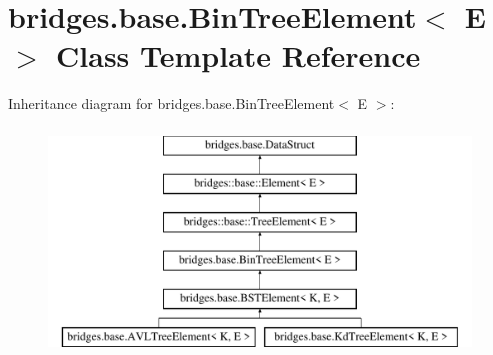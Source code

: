 \hypertarget{classbridges_1_1base_1_1_bin_tree_element}{}\section{bridges.\+base.\+Bin\+Tree\+Element$<$ E $>$ Class Template Reference}
\label{classbridges_1_1base_1_1_bin_tree_element}
Inheritance diagram for bridges.\+base.\+Bin\+Tree\+Element$<$ E $>$\+:\begin{figure}[H]
\begin{center}
\leavevmode
\includegraphics[height=6.000000cm]{classbridges_1_1base_1_1_bin_tree_element}
\end{center}
\end{figure}
